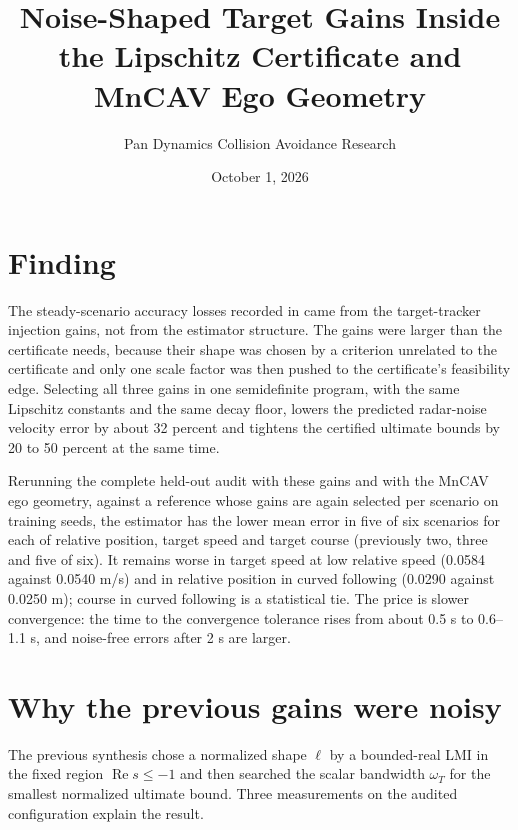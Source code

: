\documentclass[11pt]{article}
\title{Noise-Shaped Target Gains Inside the Lipschitz Certificate\newline
and MnCAV Ego Geometry}
\author{Pan Dynamics Collision Avoidance Research}
\date{October 1, 2026}
\begin{document}
\maketitle

\section{Finding}
The steady-scenario accuracy losses recorded in
 came from the target-tracker
injection gains, not from the estimator structure. The gains were larger than
the certificate needs, because their shape was chosen by a criterion unrelated
to the certificate and only one scale factor was then pushed to the
certificate's feasibility edge. Selecting all three gains in one semidefinite
program, with the same Lipschitz constants and the same decay floor, lowers
the predicted radar-noise velocity error by about 32 percent and tightens the
certified ultimate bounds by 20 to 50 percent at the same time.

Rerunning the complete held-out audit with these gains and with the MnCAV ego
geometry, against a reference whose gains are again selected per scenario on
training seeds, the estimator has the lower mean error in five of six
scenarios for each of relative position, target speed and target course
(previously two, three and five of six). It remains worse in target speed at
low relative speed (0.0584 against 0.0540 m/s) and in relative position in
curved following (0.0290 against 0.0250 m); course in curved following is a
statistical tie. The price is slower convergence: the time to the convergence
tolerance rises from about 0.5 s to 0.6--1.1 s, and noise-free errors after
2 s are larger.

\section{Why the previous gains were noisy}
The previous synthesis chose a normalized shape $\ell$ by a bounded-real LMI
in the fixed region $\operatorname{Re}s\le-1$ and then searched the scalar
bandwidth $\omega_T$ for the smallest normalized ultimate bound. Three
measurements on the audited configuration explain the result.
\end{document}
